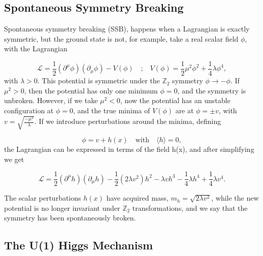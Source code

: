 \documentclass[EPJ,twocolumn]{webofc}
\begin{document}
\subsection*{Spontaneous Symmetry Breaking}

Spontaneous symmetry breaking (SSB), happens when a Lagrangian is exactly symmetric, but the ground state is not, for example, take a real scalar field $\phi$, with the Lagrangian

\begin{equation}
    \mathcal{L} = \frac{1}{2}\left(\partial^{\mu}\phi\right)\left(\partial_{\mu}\phi\right)-V(\phi) \quad\text{;}\quad  V(\phi)=\frac{1}{2}\mu^2\phi^2+\frac{1}{4}\lambda\phi^4,
\end{equation}
with $\lambda > 0$. This potential is symmetric under the $\mathbb{Z}_2$ symmetry $\phi \to -\phi$. If $\mu^2 > 0$, then the potential has only one minimum $\phi = 0$, and the symmetry is unbroken. However, if we take $\mu^2 < 0$, now the potential has an unstable configuration at $\phi = 0$, and the true minima of  $V(\phi)$ are at $\phi = \pm v$, with $v = \sqrt{\frac{-\mu^2}{\lambda}}$. If we introduce perturbations around the minima, defining

\begin{equation}
    \phi = v + h(x) 
    \quad\text{with}\quad 
    \langle h\rangle = 0,
\end{equation}
the Lagrangian can be expressed in terms of the field h(x), and after simplifying we get

\begin{equation}
    \mathcal{L} = \frac{1}{2}\left(\partial^{\mu}h\right)\left(\partial_{\mu}h\right)-\frac{1}{2}\left(2\lambda v^2\right)h^2-\lambda v h^3-\frac{1}{4}\lambda h^4+\frac{1}{4}\lambda v^4.
\end{equation}

The scalar perturbations $h(x)$  have acquired mass, $m_h=\sqrt{2\lambda v^2}$, while the new potential is no longer invariant under $\mathbb{Z}_2$ transformations, and we say that the symmetry has been spontaneously broken.

\subsection*{The U(1) Higgs Mechanism}
\end{document}
